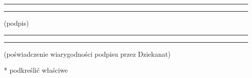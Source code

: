 \documentclass[a4paper,twoside,12pt]{book}
\newcommand{\Title}{Automated gradient boosting framework for classification data}
\begin{document}
\vfill

\rule{0.5\textwidth}{0cm}\dotfill

\rule{0.5\textwidth}{0cm}
\begin{minipage}{0.45\textwidth}
{\begin{center}(podpis)\end{center}}
\end{minipage}

\vfill

\rule{0.5\textwidth}{0cm}\dotfill

\rule{0.5\textwidth}{0cm}
\begin{minipage}{0.45\textwidth}
{\begin{center}\rule{0mm}{5mm}(poświadczenie wiarygodności podpisu przez Dziekanat)\end{center}}
\end{minipage}


\vfill

* podkreślić właściwe






















\pagestyle{onlyPageNumbers}
\tableofcontents
\end{document}
